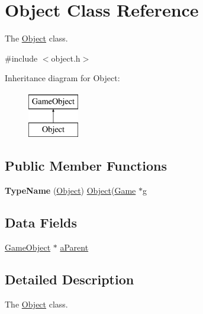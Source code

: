 \hypertarget{class_object}{\section{\-Object \-Class \-Reference}
\label{class_object}
}


\-The \hyperlink{class_object}{\-Object} class.  




{\ttfamily \#include $<$object.\-h$>$}

\-Inheritance diagram for \-Object\-:\begin{figure}[H]
\begin{center}
\leavevmode
\includegraphics[height=2.000000cm]{class_object}
\end{center}
\end{figure}
\subsection*{\-Public \-Member \-Functions}
\begin{DoxyCompactItemize}
\item 
\hypertarget{class_object_a034d232268902bc13af1e73b237ef6a0}{{\bfseries \-Type\-Name} (\hyperlink{class_object}{\-Object}) \hyperlink{class_object}{\-Object}(\hyperlink{class_game}{\-Game} $\ast$g}\label{class_object_a034d232268902bc13af1e73b237ef6a0}

\end{DoxyCompactItemize}
\subsection*{\-Data \-Fields}
\begin{DoxyCompactItemize}
\item 
\hyperlink{class_game_object}{\-Game\-Object} $\ast$ \hyperlink{class_object_a4b9173b5a9a1e5c313df5b574716037a}{a\-Parent}
\end{DoxyCompactItemize}


\subsection{\-Detailed \-Description}
\-The \hyperlink{class_object}{\-Object} class. 

